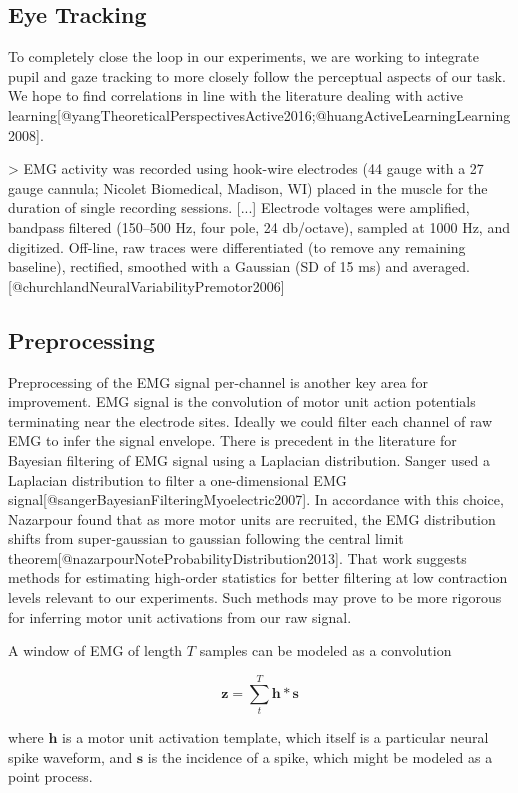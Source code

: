 \documentclass[../main.tex]{subfiles}
\begin{document}
\subsection{Eye Tracking}

To completely close the loop in our experiments, we are working to integrate pupil and gaze tracking to more closely follow the perceptual aspects of our task. We hope to find correlations in line with the literature dealing with active learning[@yangTheoreticalPerspectivesActive2016;@huangActiveLearningLearning2008]. 

> EMG activity was recorded using hook-wire electrodes (44 gauge with a 27 gauge cannula; Nicolet Biomedical, Madison, WI) placed in the muscle for the duration of single recording sessions. [...] Electrode voltages were amplified, bandpass filtered (150–500 Hz, four pole, 24 db/octave), sampled at 1000 Hz, and digitized. Off-line, raw traces were differentiated (to remove any remaining baseline), rectified, smoothed with a Gaussian (SD of 15 ms) and averaged. [@churchlandNeuralVariabilityPremotor2006] 

\subsection{Preprocessing}

Preprocessing of the EMG signal per-channel is another key area for improvement. EMG signal is the convolution of motor unit action potentials terminating near the electrode sites. Ideally we could filter each channel of raw EMG to infer the signal envelope. There is precedent in the literature for Bayesian filtering of EMG signal using a Laplacian distribution. Sanger used a Laplacian distribution to filter a one-dimensional EMG signal[@sangerBayesianFilteringMyoelectric2007]. In accordance with this choice, Nazarpour found that as more motor units are recruited, the EMG distribution shifts from super-gaussian to gaussian following the central limit theorem[@nazarpourNoteProbabilityDistribution2013]. That work suggests methods for estimating high-order statistics for better filtering at low contraction levels relevant to our experiments. Such methods may prove to be more rigorous for inferring motor unit activations from our raw signal.


A window of EMG of length $T$ samples can be modeled as a convolution

$$
\mathbf{z} = \sum_t^T \mathbf{h} * \mathbf{s}
$$

where $\mathbf{h}$ is a motor unit activation template, which itself is a particular neural spike waveform, and $\mathbf{s}$ is the incidence of a spike, which might be modeled as a point process.  
\end{document}
